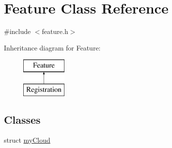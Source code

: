 \hypertarget{class_feature}{}\section{Feature Class Reference}
\label{class_feature}


{\ttfamily \#include $<$feature.\+h$>$}

Inheritance diagram for Feature\+:\begin{figure}[H]
\begin{center}
\leavevmode
\includegraphics[height=2.000000cm]{class_feature}
\end{center}
\end{figure}
\subsection*{Classes}
\begin{DoxyCompactItemize}
\item 
struct \hyperlink{struct_feature_1_1my_cloud}{my\+Cloud}
\end{DoxyCompactItemize}
